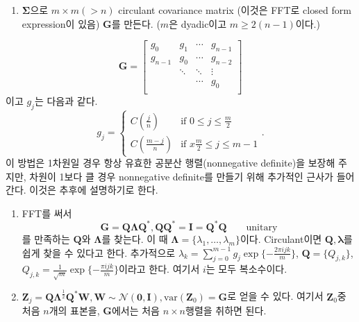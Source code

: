 \documentclass[b5paper,]{scrbook}
\providecommand{\tightlist}{%
  \setlength{\itemsep}{0pt}\setlength{\parskip}{0pt}}
\theoremstyle{plain}
\theoremstyle{definition}
\numberwithin{equation}{section}
\begin{document}
\begin{enumerate}
\def\labelenumi{\arabic{enumi}.}
\tightlist
\item
  \(\boldsymbol{\Sigma}\)으로 \(m\times m (>n)\) circulant covariance matrix (이것은 FFT로 closed form expression이 있음) \(\mathbf{G}\)를 만든다. (\(m\)은 dyadic이고 \(m \geq 2(n-1)\)이다.)
\end{enumerate}

\[
\mathbf{G}=
\begin{bmatrix}
g_{0} & g_{1} & \cdots & g_{n-1}\\
g_{n-1} & g_{0} & \cdots & g_{n-2}\\
 & \ddots & \ddots & \vdots\\
 &  & \cdots & g_{0}\\
\end{bmatrix}
\]
이고 \(g_{j}\)는 다음과 같다.
\[
g_{j}=
\begin{cases}
C(\frac{j}{n}) & \text{if } 0 \leq j \leq \frac{m}{2} \\
C(\frac{m-j}{n}) & \text{if } x \frac{m}{2} \leq j \leq m-1
\end{cases}.
\]
이 방법은 1차원일 경우 항상 유효한 공분산 행렬(nonnegative definite)을 보장해 주지만, 차원이 1보다 클 경우 nonnegative definite를 만들기 위해 추가적인 근사가 들어간다. 이것은 추후에 설명하기로 한다.

\begin{enumerate}
\def\labelenumi{\arabic{enumi}.}
\setcounter{enumi}{1}
\item
  FFT를 써서
  \[\mathbf{G}=\mathbf{Q}\boldsymbol{\Lambda}\mathbf{Q}^{*}, \mathbf{Q}\mathbf{Q}^{*}=\mathbf{I}=\mathbf{Q}^{*}\mathbf{Q} \qquad{\text{unitary}}\]
  를 만족하는 \(\mathbf{Q}\)와 \(\boldsymbol{\Lambda}\)를 찾는다. 이 때 \(\boldsymbol{\Lambda}=\{\lambda_{1},\ldots,\lambda_{m} \}\)이다. Circulant이면 \(\mathbf{Q}, \boldsymbol{\lambda}\)를 쉽게 찾을 수 있다고 한다. 추가적으로 \(\lambda_{k}=\sum_{j=0}^{m-1}g_{j}\exp\{ -\frac{2\pi i j k}{m} \}\), \(\mathbf{Q}=\{Q_{j,k}\}\), \(Q_{j,k}=\frac{1}{\sqrt{m}}\exp\{-\frac{\pi i j k}{m}\}\)이라고 한다. 여기서 \(i\)는 모두 복소수이다.
\item
  \(\mathbf{Z}_{j}=\mathbf{Q}\boldsymbol{\Lambda}^{\frac{1}{2}}\mathbf{Q}^{*}\mathbf{W}, \mathbf{W}\sim\mathcal{N}(\mathbf{0}, \mathbf{I}), \text{var}(\mathbf{Z}_{0})=\mathbf{G}\)로 얻을 수 있다. 여기서 \(\mathbf{Z}_{0}\)중 처음 \(n\)개의 표본을, \(\mathbf{G}\)에서는 처음 \(n\times n\)행렬을 취하면 된다.
\end{enumerate}
\end{document}
